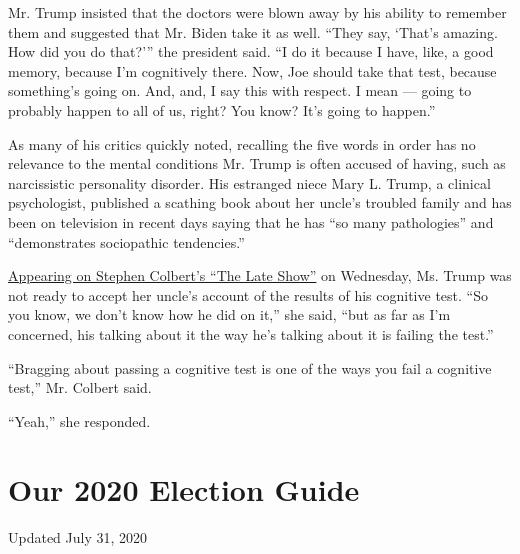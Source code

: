 Mr. Trump insisted that the doctors were blown away by his ability to
remember them and suggested that Mr. Biden take it as well. ``They say,
`That's amazing. How did you do that?''' the president said. ``I do it
because I have, like, a good memory, because I'm cognitively there. Now,
Joe should take that test, because something's going on. And, and, I say
this with respect. I mean --- going to probably happen to all of us,
right? You know? It's going to happen.''

As many of his critics quickly noted, recalling the five words in order
has no relevance to the mental conditions Mr. Trump is often accused of
having, such as narcissistic personality disorder. His estranged niece
Mary L. Trump, a clinical psychologist, published a scathing book about
her uncle's troubled family and has been on television in recent days
saying that he has ``so many pathologies'' and ``demonstrates
sociopathic tendencies.''

\href{https://www.youtube.com/watch?v=rOkx-PAHUrQ}{Appearing on Stephen
Colbert's ``The Late Show''} on Wednesday, Ms. Trump was not ready to
accept her uncle's account of the results of his cognitive test. ``So
you know, we don't know how he did on it,'' she said, ``but as far as
I'm concerned, his talking about it the way he's talking about it is
failing the test.''

``Bragging about passing a cognitive test is one of the ways you fail a
cognitive test,'' Mr. Colbert said.

``Yeah,'' she responded.

\hypertarget{our-2020-election-guide}{%
\section{Our 2020 Election Guide}\label{our-2020-election-guide}}

Updated July 31, 2020

